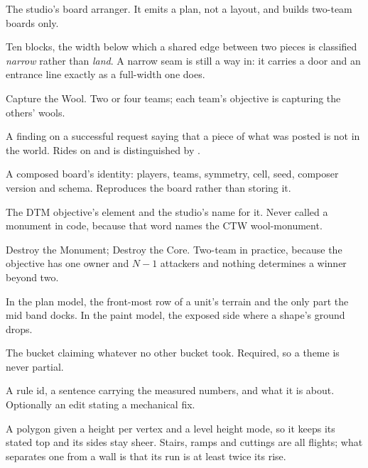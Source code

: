 \begin{description}[leftmargin=0pt,style=nextline,itemsep=3pt,font=\normalfont\sffamily\bfseries]
\item[Composer] The studio's board arranger. It emits a plan, not a layout, and
  builds two-team boards only.

\item[Corridor minimum] Ten blocks, the width below which a shared edge between two
  pieces is classified \emph{narrow} rather than \emph{land}. A narrow seam is still
  a way in: it carries a door and an entrance line exactly as a full-width one does.

\item[CTW] Capture the Wool. Two or four teams; each team's objective is capturing
  the others' wools.

\item[Decline] A finding on a successful request saying that a piece of what was
  posted is not in the world. Rides on  and is distinguished by
  .

\item[Descriptor] A composed board's identity: players, teams, symmetry, cell, seed,
  composer version and schema. Reproduces the board rather than storing it.

\item[Destroyable] The DTM objective's element and the studio's name for it. Never
  called a monument in code, because that word names the CTW wool-monument.

\item[DTM / DTC] Destroy the Monument; Destroy the Core. Two-team in practice,
  because the objective has one owner and $N-1$ attackers and nothing determines a
  winner beyond two.

\item[Face] In the plan model, the front-most row of a unit's terrain and the only
  part the mid band docks. In the paint model, the exposed side where a shape's
  ground drops.

\item[Fill] The bucket claiming whatever no other bucket took. Required, so a theme
  is never partial.

\item[Finding] A rule id, a sentence carrying the measured numbers, and what it is
  about. Optionally an edit stating a mechanical fix.

\item[Flight] A polygon given a height per vertex and a level height mode, so it keeps
  its stated top and its sides stay sheer. Stairs, ramps and cuttings are all flights;
  what separates one from a wall is that its run is at least twice its rise.


\end{description}

